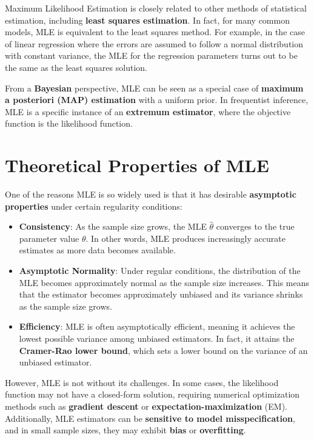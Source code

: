 \documentclass[
  12 pt,
  a4paper,
]{book}
\numberwithin{equation}{section}
\theoremstyle{plain}      %
\theoremstyle{definition} %
\theoremstyle{remark}     %
\theoremstyle{note}         %
\begin{document}
Maximum Likelihood Estimation is closely related to other methods of
statistical estimation, including \textbf{least squares estimation}. In
fact, for many common models, MLE is equivalent to the least squares
method. For example, in the case of linear regression where the errors
are assumed to follow a normal distribution with constant variance, the
MLE for the regression parameters turns out to be the same as the least
squares solution.

From a \textbf{Bayesian} perspective, MLE can be seen as a special case
of \textbf{maximum a posteriori (MAP) estimation} with a uniform prior.
In frequentist inference, MLE is a specific instance of an
\textbf{extremum estimator}, where the objective function is the
likelihood function.

\hypertarget{theoretical-properties-of-mle}{%
\section{Theoretical Properties of
MLE}\label{theoretical-properties-of-mle}}

One of the reasons MLE is so widely used is that it has desirable
\textbf{asymptotic properties} under certain regularity conditions:

\begin{itemize}
\item
  \textbf{Consistency}: As the sample size grows, the MLE
  \(\hat{\theta}\) converges to the true parameter value \(\theta\). In
  other words, MLE produces increasingly accurate estimates as more data
  becomes available.
\item
  \textbf{Asymptotic Normality}: Under regular conditions, the
  distribution of the MLE becomes approximately normal as the sample
  size increases. This means that the estimator becomes approximately
  unbiased and its variance shrinks as the sample size grows.
\item
  \textbf{Efficiency}: MLE is often asymptotically efficient, meaning it
  achieves the lowest possible variance among unbiased estimators. In
  fact, it attains the \textbf{Cramer-Rao lower bound}, which sets a
  lower bound on the variance of an unbiased estimator.
\end{itemize}

However, MLE is not without its challenges. In some cases, the
likelihood function may not have a closed-form solution, requiring
numerical optimization methods such as \textbf{gradient descent} or
\textbf{expectation-maximization} (EM). Additionally, MLE estimators can
be \textbf{sensitive to model misspecification}, and in small sample
sizes, they may exhibit \textbf{bias} or \textbf{overfitting}.
\end{document}
